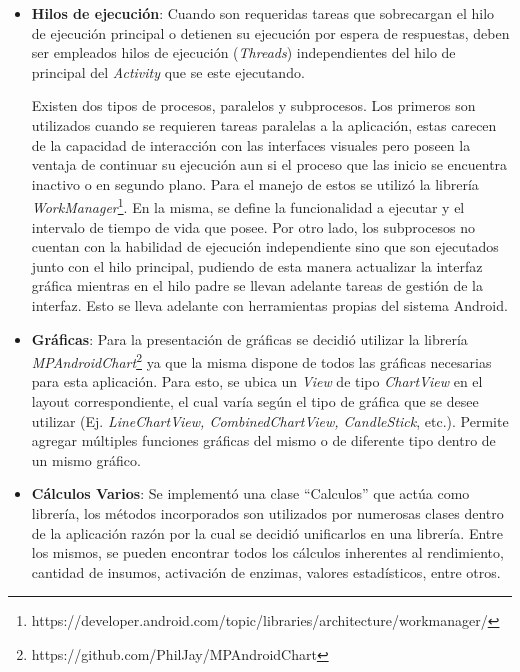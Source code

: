 \begin{itemize}
        \item \textbf{Hilos de ejecución}: Cuando son requeridas tareas que sobrecargan el hilo de ejecución principal o detienen su ejecución por espera de respuestas, deben ser empleados hilos de ejecución (\textit{Threads}) independientes del hilo de principal del \textit{Activity} que se este ejecutando.
        
        \par Existen dos tipos de procesos, paralelos y subprocesos. Los primeros son utilizados cuando se requieren tareas paralelas a la aplicación, estas carecen de la capacidad de interacción con las interfaces visuales pero poseen la ventaja de continuar su ejecución aun si el proceso que las inicio se encuentra inactivo o en segundo plano. Para el manejo de estos se utilizó la librería \textit{WorkManager}\footnote{https://developer.android.com/topic/libraries/architecture/workmanager/}. En la misma, se define la funcionalidad a ejecutar y el intervalo de tiempo de vida que posee. Por otro lado, los subprocesos no cuentan con la habilidad de ejecución independiente sino que son ejecutados junto con el hilo principal, pudiendo de esta manera actualizar la interfaz gráfica mientras en el hilo padre se llevan adelante tareas de gestión de la interfaz. Esto se lleva adelante con herramientas propias del sistema Android.
        
        \item \textbf{Gráficas}: Para la presentación de gráficas se decidió utilizar la librería \textit{MPAndroidChart}\footnote{https://github.com/PhilJay/MPAndroidChart} ya que la misma dispone de todos las gráficas necesarias para esta aplicación. Para esto, se ubica un \textit{View} de tipo \textit{ChartView} en el layout correspondiente, el cual varía según el tipo de gráfica que se desee utilizar (Ej. \textit{LineChartView, CombinedChartView, CandleStick}, etc.). Permite agregar múltiples funciones gráficas del mismo o de diferente tipo dentro de un mismo gráfico.
        
        \item \textbf{Cálculos Varios}: Se implementó una clase ``Calculos'' que actúa como librería, los métodos incorporados son utilizados por numerosas clases dentro de la aplicación razón por la cual se decidió unificarlos en una librería. Entre los mismos, se pueden encontrar todos los cálculos inherentes al rendimiento, cantidad de insumos, activación de enzimas, valores estadísticos, entre otros.
     \end{itemize}
    
